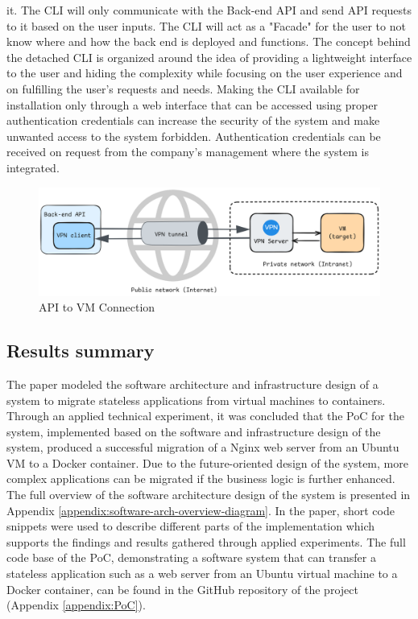 \documentclass[twocolumn]{article}
\begin{document}
it. The CLI will only communicate with the Back-end API and send API requests to it based on the user inputs. The CLI will act as a "Facade" for the user to not know where and how the back end is deployed and functions. The concept behind the detached CLI is organized around the idea of providing a lightweight interface to the user and hiding the complexity while focusing on the user experience and on fulfilling the user's requests and needs. Making the CLI available for installation only through a web interface that can be accessed using proper authentication credentials can increase the security of the system and make unwanted access to the system forbidden. Authentication credentials can be received on request from the company's management where the system is integrated.

\begin{figure}[H]
    \centering
    \includegraphics[width=\linewidth]{images/api-vm-connection.png}
    \caption{API to VM Connection}
    \label{fig:api-vm-connection}
\end{figure}

\subsection{Results summary}
The paper modeled the software architecture and infrastructure design of a system to migrate stateless applications from virtual machines to containers. Through an applied technical experiment, it was concluded that the PoC for the system, implemented based on the software and infrastructure design of the system, produced a successful migration of a Nginx web server from an Ubuntu VM to a Docker container. Due to the future-oriented design of the system, more complex applications can be migrated if the business logic is further enhanced. The full overview of the software architecture design of the system is presented in Appendix \ref{appendix:software-arch-overview-diagram}. In the paper, short code snippets were used to describe different parts of the implementation which supports the findings and results gathered through applied experiments. The full code base of the PoC, demonstrating a software system that can transfer a stateless application such as a web server from an Ubuntu virtual machine to a Docker container, can be found in the GitHub repository of the project (Appendix \ref{appendix:PoC}).
\end{document}
